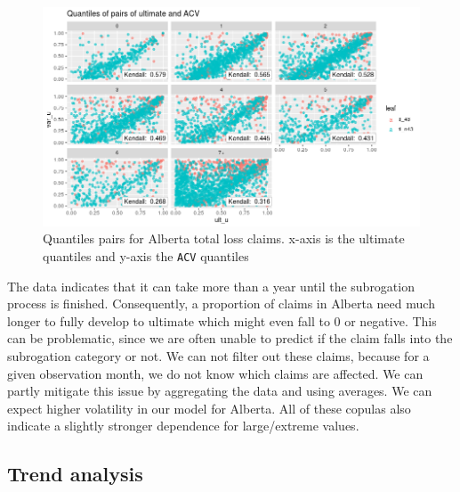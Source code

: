 	\begin{figure}[H]
		\begin{center}
			\includegraphics[scale=0.4]{Graphiques/ab_tl} 
			\renewcommand{\figurename}{Figure}
			\caption{Quantiles pairs for Alberta total loss claims. x-axis is the ultimate quantiles and y-axis the \texttt{ACV} quantiles}\label{Fig_copula_ab_tl}
		\end{center}
	\end{figure}

	The data indicates that it can take more than a year until the subrogation process is finished. Consequently, a proportion of claims in Alberta need much longer to fully develop to ultimate which might even fall to 0 or negative. This can be problematic, since we are often unable to predict if the claim falls into the subrogation category or not. We can not filter out these claims, because for a given observation month, we do not know which claims are affected. We can partly mitigate this issue by aggregating the data and using averages. We can expect higher volatility in our model for Alberta. 
	All of these copulas also indicate a slightly stronger dependence for large/extreme values. 
	
	\subsection{Trend analysis}
	
